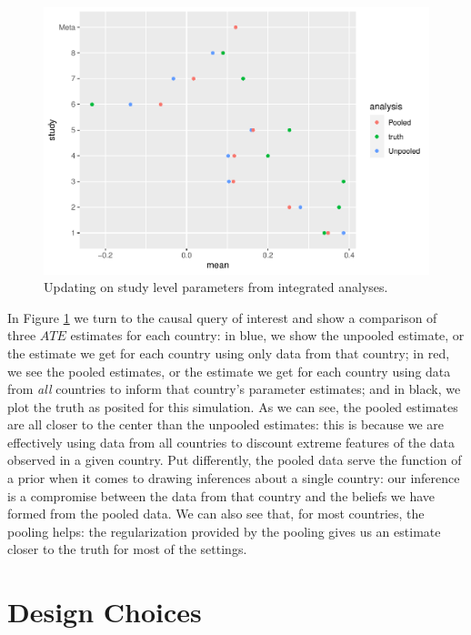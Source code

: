 \documentclass[
  12pt,
]{book}
\begin{document}
\begin{figure}
\centering
\includegraphics{ii_files/figure-latex/metaplot-1.pdf}
\caption{\label{fig:metaplot}Updating on study level parameters from integrated analyses.}
\end{figure}

In Figure \ref{fig:metaplot} we turn to the causal query of interest and show a comparison of three \(ATE\) estimates for each country: in blue, we show the unpooled estimate, or the estimate we get for each country using only data from that country; in red, we see the pooled estimates, or the estimate we get for each country using data from \emph{all} countries to inform that country's parameter estimates; and in black, we plot the truth as posited for this simulation. As we can see, the pooled estimates are all closer to the center than the unpooled estimates: this is because we are effectively using data from all countries to discount extreme features of the data observed in a given country. Put differently, the pooled data serve the function of a prior when it comes to drawing inferences about a single country: our inference is a compromise between the data from that country and the beliefs we have formed from the pooled data. We can also see that, for most countries, the pooling helps: the regularization provided by the pooling gives us an estimate closer to the truth for most of the settings.

\hypertarget{part-design-choices}{%
\part{Design Choices}\label{part-design-choices}}
\end{document}
